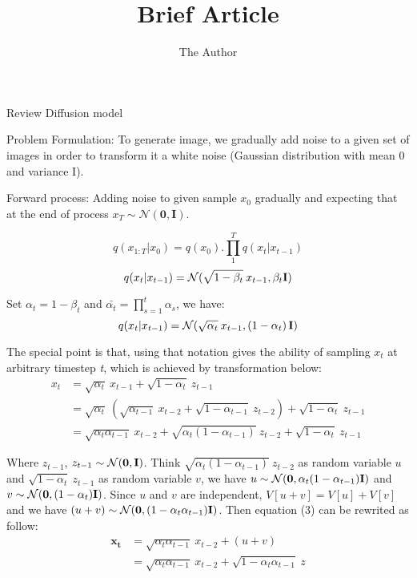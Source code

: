 \documentclass[11pt, oneside]{article}   	%
\title{Brief Article}
\author{The Author}
\begin{document}
Review Diffusion model

Problem Formulation: To generate image, we gradually add noise to a given set of images in order to transform it a white noise (Gaussian distribution with mean 0 and variance I).

Forward process: Adding noise to given sample $x_{0}$ gradually and expecting that at the end of process ${x_{T} \sim \mathcal{N}(\mathbf{0}, \mathbf{I})}$.

\[
	q(x_{1:T}|x_{0}) = q(x_{0}).\prod^{T}_{1} q(x_{t}|x_{t-1})
\]
\[
	q(x_{t}|x_{t-1}) = \mathcal{N}(\sqrt{1-\beta_{t}}\:x_{t-1}, \beta_{t}\bold{I})
\]

\hspace{0.5cm} Set $\alpha_{t} = 1 - \beta_{t}$ and $\bar{\alpha_{t}} = \prod_{s=1}^{t}{\alpha_{s}}$, we have:
\[
	q(x_{t}|x_{t-1}) = \mathcal{N}(\sqrt{\alpha_{t}}\:x_{t-1}, (1-\alpha_{t})\,\bold{I})
\]

The special point is that, using that notation gives the ability of sampling $x_{t}$ at arbitrary timestep \textit{t}, which is achieved by transformation below:
\begin{align}
	x_{t}&= \sqrt{\alpha_{t}}\:x_{t-1} + \sqrt{1-\alpha_{t}}\:z_{t-1} \\
	&= \sqrt{\alpha_{t}}\:(\sqrt{\alpha_{t-1}}\:x_{t-2} + \sqrt{1-\alpha_{t-1}}\:z_{t-2}) + \sqrt{1-\alpha_{t}}\:z_{t-1} \\
	&= \sqrt{\alpha_{t}\alpha_{t-1}}\:x_{t-2} + \sqrt{\alpha_{t}(1 - \alpha_{t-1})}\:z_{t-2} + \sqrt{1-\alpha_{t}}\:z_{t-1}
\end{align}

Where $z_{t-1}$, $z_{t-1} \sim \mathcal{N}(\mathbf{0}, \bold{I})$. Think $\sqrt{\alpha_{t}(1 - \alpha_{t-1})}\:z_{t-2}$ as random variable $u$ and $\sqrt{1-\alpha_{t}}\:z_{t-1}$ as random variable $v$, we have $u \sim \mathcal{N}(\mathbf{0}, \alpha_{t}(1-\alpha_{t-1})\bold{I})$ and $v \sim \mathcal{N}(\mathbf{0}, (1-\alpha_{t})\bold{I})$. Since $u$ and $v$ are independent, $V[u + v] = V[u] + V[v]$ and we have ${(u + v) \sim \mathcal{N}(\mathbf{0}, (1-\alpha_{t}\alpha_{t-1})\bold{I})}$. Then equation (3) can be rewrited as follow:
\begin{align}
\mathbf{x_{t}}
	&= \sqrt{\alpha_{t}\alpha_{t-1}}\:x_{t-2} + (u + v) \\
	&= \sqrt{\alpha_{t}\alpha_{t-1}}\:x_{t-2} + \sqrt{1-\alpha_{t}\alpha_{t-1}}\:z
\end{align}
\end{document}
